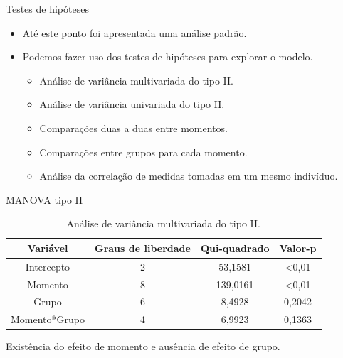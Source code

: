 \documentclass[
  ignorenonframetext,
  serif,
  professionalfont,
  usenames,
  dvipsnames,
  aspectratio = 169]{beamer}
\begin{document}
\begin{frame}{Testes de hipóteses}
\protect\hypertarget{testes-de-hipuxf3teses-4}{}
\begin{itemize}
  \itemsep 2ex
  
  \item Até este ponto foi apresentada uma análise padrão. 

  \item Podemos fazer uso dos testes de hipóteses para explorar o modelo.
  
  \begin{itemize}
    \item Análise de variância multivariada do tipo II.
    \item Análise de variância univariada do tipo II.
    \item Comparações duas a duas entre momentos.
    \item Comparações entre grupos para cada momento.
    \item Análise da correlação de medidas tomadas em um mesmo indivíduo.
  \end{itemize}
  
\end{itemize}
\end{frame}

\begin{frame}{MANOVA tipo II}
\protect\hypertarget{manova-tipo-ii}{}
\begin{table}[H]
\centering
\begin{tabular}{cccc}
\hline
Variável      & Graus de liberdade & Qui-quadrado & Valor-p        \\ \hline
Intercepto    & 2                  & 53,1581      & \textless 0,01 \\
Momento       & 8                  & 139,0161     & \textless 0,01 \\
Grupo         & 6                  & 8,4928       & 0,2042         \\
Momento*Grupo & 4                  & 6,9923       & 0,1363         \\ \hline
\end{tabular}
\caption{Análise de variância multivariada do tipo II.}
\label{tab:manovaII}
\end{table}

Existência do efeito de momento e ausência de efeito de grupo.
\end{frame}
\end{document}
